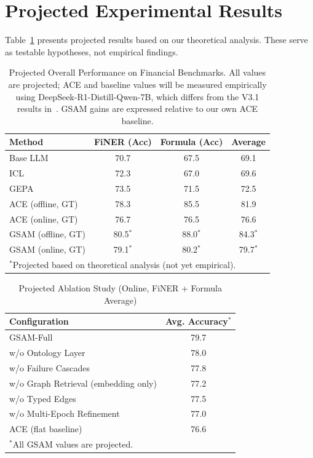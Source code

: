 \documentclass[12pt,a4paper]{article}
\begin{document}
\section{Projected Experimental Results}
\label{app:projected}

Table~\ref{tab:projected-overall} presents projected results based on our theoretical analysis. These serve as testable hypotheses, not empirical findings.

\begin{table}[h]
\centering
\caption{Projected Overall Performance on Financial Benchmarks. All values are projected; ACE and baseline values will be measured empirically using DeepSeek-R1-Distill-Qwen-7B, which differs from the V3.1 results in~\cite{ace2025}. GSAM gains are expressed relative to our own ACE baseline.}
\label{tab:projected-overall}
\small
\begin{tabular}{@{}lccc@{}}
\toprule
\textbf{Method} & \textbf{FiNER (Acc)} & \textbf{Formula (Acc)} & \textbf{Average} \\
\midrule
Base LLM & 70.7 & 67.5 & 69.1 \\
ICL & 72.3 & 67.0 & 69.6 \\
GEPA & 73.5 & 71.5 & 72.5 \\
ACE (offline, GT) & 78.3 & 85.5 & 81.9 \\
ACE (online, GT) & 76.7 & 76.5 & 76.6 \\
\midrule
GSAM (offline, GT) & 80.5$^*$ & 88.0$^*$ & 84.3$^*$ \\
GSAM (online, GT) & 79.1$^*$ & 80.2$^*$ & 79.7$^*$ \\
\bottomrule
\multicolumn{4}{l}{\scriptsize $^*$Projected based on theoretical analysis (not yet empirical).} \\
\end{tabular}
\end{table}

\begin{table}[h]
\centering
\caption{Projected Ablation Study (Online, FiNER + Formula Average)}
\label{tab:projected-ablation}
\small
\begin{tabular}{@{}lc@{}}
\toprule
\textbf{Configuration} & \textbf{Avg. Accuracy}$^*$ \\
\midrule
GSAM-Full & 79.7 \\
\quad w/o Ontology Layer & 78.0 \\
\quad w/o Failure Cascades & 77.8 \\
\quad w/o Graph Retrieval (embedding only) & 77.2 \\
\quad w/o Typed Edges & 77.5 \\
\quad w/o Multi-Epoch Refinement & 77.0 \\
ACE (flat baseline) & 76.6 \\
\bottomrule
\multicolumn{2}{l}{\scriptsize $^*$All GSAM values are projected.} \\
\end{tabular}
\end{table}
\end{document}

